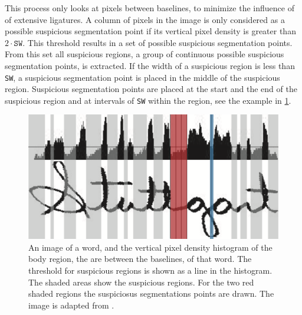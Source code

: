 	This process only looks at pixels between baselines, to minimize the influence of of extensive ligatures. A column of pixels in the image is only considered as a possible suspicious segmentation point if its vertical pixel density is greater than $2 \cdot \mathtt{SW}$. This threshold results in a set of possible suspicious segmentation points. From this set all suspicious regions, a group of continuous possible suspicious segmentation points, is extracted. If the width of a suspicious region is less than \texttt{SW}, a suspicious segmentation point is placed in the middle of the suspicious region. Suspicious segmentation points are placed at the start and the end of the suspicious region and at intervals of \texttt{SW} within the region, see the example in \cref{fig:method:segmentation:suspiciousSegmentationPoints}.

	\begin{figure}
		\centering
		\includegraphics[width=\columnwidth]{shared/img/method/suspicious_regions.png}
		\caption{An image of a word, and the vertical pixel density histogram of the body region, the are between the baselines, of that word. The threshold for suspicious regions is shown as a line in the histogram. The shaded areas show the suspicious regions. For the two red shaded regions the suspiciosus segmentations points are drawn. The image is adapted from \cite{lee2012binary}.}
		\label{fig:method:segmentation:suspiciousSegmentationPoints}
	\end{figure}

